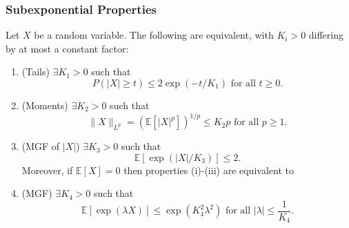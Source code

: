 \subsubsection{Subexponential Properties}
\begin{proposition}
\label{prop:2.8.1}
Let $X$ be a random variable. The following are equivalent, with $K_i > 0$ differing by at most a 
constant factor: 
\begin{enumerate}[label=(\roman*)]
	\item (Tails) $\exists K_1 > 0$ such that
	\[ P(|X| \geq t) \leq 2\exp{(-t / K_1)} \text{ for all } t \geq 0. \]
	\item (Moments) $\exists K_2 > 0$ such that 
	\[ \lVert X \rVert_{L^p} = (\mathbb{E}[|X|^p])^{1/p} \leq K_2 p \text{ for all } p \geq 1. \]
	\item (MGF of $|X|$) $\exists K_3 > 0$ such that 
	\[ \mathbb{E}[\exp{(|X| / K_3)}] \leq 2. \]
	Moreover, if $\mathbb{E}[X] = 0$ then properties (i)-(iii) are equivalent to 
	\item (MGF) $\exists K_4 > 0$ such that 
	\[ \mathbb{E}[\exp{(\lambda X)}] \leq \exp{(K_4^2 \lambda^2)} \text{ for all } |\lambda| 
	\leq \frac{1}{K_4}. \]
\end{enumerate}
\end{proposition}


